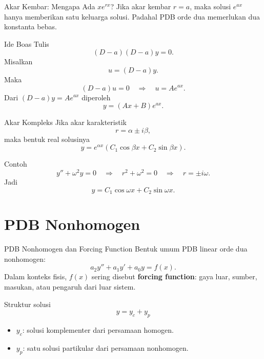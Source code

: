 \documentclass[aspectratio=169,11pt]{beamer}
\begin{document}
\begin{frame}{Akar Kembar: Mengapa Ada $xe^{rx}$?}
Jika akar kembar $r=a$, maka solusi $e^{ax}$ hanya memberikan satu keluarga solusi.
Padahal PDB orde dua memerlukan dua konstanta bebas.
\begin{block}{Ide Boas}
Tulis
\[
(D-a)(D-a)y=0.
\]
Misalkan
\[
u=(D-a)y.
\]
Maka
\[
(D-a)u=0 \quad \Rightarrow \quad u=Ae^{ax}.
\]
Dari $(D-a)y=Ae^{ax}$ diperoleh
\[
\boxed{y=(A x+B)e^{ax}}.
\]
\end{block}
\end{frame}

\begin{frame}{Akar Kompleks}
Jika akar karakteristik
\[
r=\alpha\pm i\beta,
\]
maka bentuk real solusinya
\[
\boxed{y=e^{\alpha x}(C_1\cos \beta x+C_2\sin \beta x)}.
\]
\begin{exampleblock}{Contoh}
\[
y''+\omega^2y=0
\quad \Rightarrow \quad
r^2+\omega^2=0
\quad \Rightarrow \quad r=\pm i\omega.
\]
Jadi
\[
y=C_1\cos \omega x+C_2\sin \omega x.
\]
\end{exampleblock}
\end{frame}

\section{PDB Nonhomogen}

\begin{frame}{PDB Nonhomogen dan Forcing Function}
Bentuk umum PDB linear orde dua nonhomogen:
\[
a_2y''+a_1y'+a_0y=f(x).
\]
Dalam konteks fisis, $f(x)$ sering disebut \textbf{forcing function}: gaya luar, sumber, masukan, atau pengaruh dari luar sistem.
\begin{block}{Struktur solusi}
\[
\boxed{y=y_c+y_p}
\]
\begin{itemize}
  \item $y_c$: solusi komplementer dari persamaan homogen.
  \item $y_p$: satu solusi partikular dari persamaan nonhomogen.
\end{itemize}
\end{block}
\end{frame}
\end{document}
